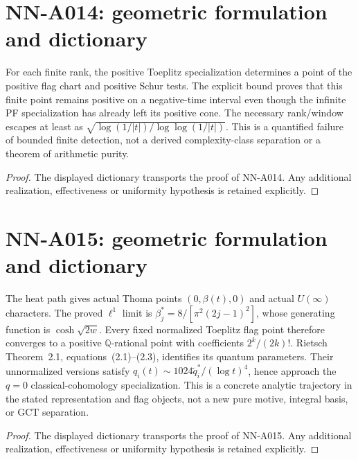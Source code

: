 \section{NN-A014: geometric formulation and dictionary}
\begin{geometricstatement}[NN-A014]
For each finite rank, the positive Toeplitz specialization determines a point of the positive flag chart and positive Schur tests. The explicit bound proves that this finite point remains positive on a negative-time interval even though the infinite PF specialization has already left its positive cone. The necessary rank/window escapes at least as $\sqrt{\log(1/|t|)/\log\log(1/|t|)}$. This is a quantified failure of bounded finite detection, not a derived complexity-class separation or a theorem of arithmetic purity.
\end{geometricstatement}
\begin{proof} The displayed dictionary transports the proof of NN-A014. Any additional realization, effectiveness or uniformity hypothesis is retained explicitly.\end{proof}


\section{NN-A015: geometric formulation and dictionary}
\begin{geometricstatement}[NN-A015]
The heat path gives actual Thoma points $(0,\beta(t),0)$ and actual $U(\infty)$ characters. The proved $\ell^1$ limit is $\beta_j^*=8/[\pi^2(2j-1)^2]$, whose generating function is $\cosh\sqrt{2w}$. Every fixed normalized Toeplitz flag point therefore converges to a positive $\mathbb Q$-rational point with coefficients $2^k/(2k)!$. Rietsch Theorem~2.1, equations~(2.1)--(2.3), identifies its quantum parameters. Their unnormalized versions satisfy $q_i(t)\sim1024\widetilde q_i^*/(\log t)^4$, hence approach the $q=0$ classical-cohomology specialization. This is a concrete analytic trajectory in the stated representation and flag objects, not a new pure motive, integral basis, or GCT separation.
\end{geometricstatement}
\begin{proof} The displayed dictionary transports the proof of NN-A015. Any additional realization, effectiveness or uniformity hypothesis is retained explicitly.\end{proof}


